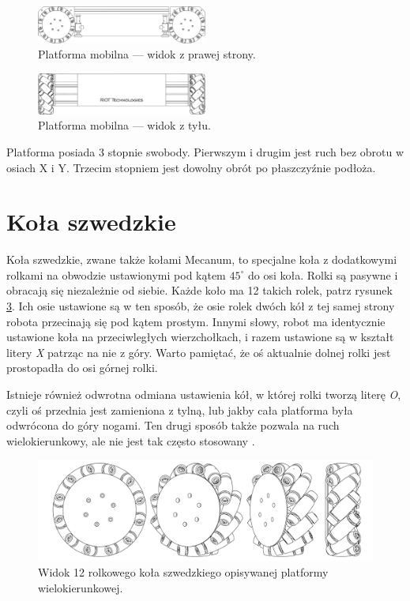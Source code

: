	\begin{figure}[H]
	\centering
	\includegraphics[width=0.5\textwidth]{graphics/base_side.pdf}
	\caption{Platforma mobilna --- widok z prawej strony.}
	\label{fig:base_side}
	\end{figure} 

	\begin{figure}[H]
	\centering
	\includegraphics[width=0.5\textwidth]{graphics/base_front.pdf}
	\caption{Platforma mobilna --- widok z tyłu.}
	\label{fig:base_front}
	\end{figure} 

	Platforma posiada 3 stopnie swobody. Pierwszym i drugim jest ruch bez obrotu w osiach X i Y.
	Trzecim stopniem jest dowolny obrót po płaszczyźnie podłoża.

\section{Koła szwedzkie}
	Koła szwedzkie, zwane także kołami Mecanum, to specjalne koła z dodatkowymi rolkami na obwodzie ustawionymi pod kątem $45^\circ$ do osi koła.
	Rolki są pasywne i obracają się niezależnie od siebie. Każde koło ma 12 takich rolek, patrz rysunek \ref{fig:wheel}.
	Ich osie ustawione są w ten sposób, że osie rolek dwóch kół z tej samej strony robota przecinają się pod kątem prostym.
	Innymi słowy, robot ma identycznie ustawione koła na przeciwległych wierzchołkach, i razem ustawione są w kształt litery \emph{X} patrząc na nie z góry.
	Warto pamiętać, że oś aktualnie dolnej rolki jest prostopadła do osi górnej rolki.

	Istnieje również odwrotna odmiana ustawienia kół, w której rolki tworzą literę \emph{O}, 
	czyli oś przednia jest zamieniona z tylną, lub jakby cała platforma była odwrócona do góry nogami.
	Ten drugi sposób także pozwala na ruch wielokierunkowy, ale nie jest tak często stosowany \cite{paletobot}.

	\begin{figure}[H]
	\centering
	\includegraphics[width=\textwidth]{graphics/wheel.pdf}
	\caption{Widok 12 rolkowego koła szwedzkiego opisywanej platformy wielokierunkowej.}
	\label{fig:wheel}
	\end{figure} 

